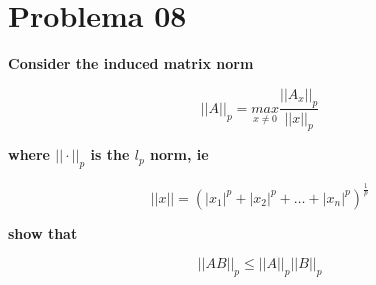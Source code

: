 \section*{Problema 08}


\textbf{Consider the induced matrix norm}

\begin{equation*}
    ||A||_p  = \underset{x\neq 0}{max} \frac{||A_x||_p}{||x||_p}
\end{equation*}

\textbf{where $||\cdot||_p$ is the $l_p$ norm, ie}

\begin{equation*}
    ||x|| = (|x_1|^p+|x_2|^p+\dots+|x_n|^p)^{\frac{1}{p}}
\end{equation*}

\textbf{show that }

\begin{equation*}
    ||AB||_p \le ||A||_p ||B||_p
\end{equation*}